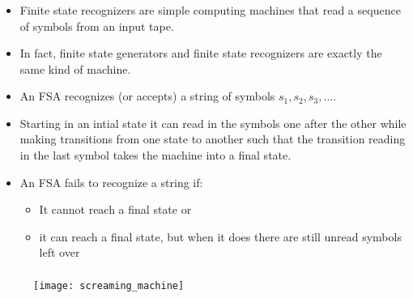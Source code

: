 \begin{frame}

	\frametitle{\insertsection}
	\framesubtitle{\insertsubsection}

	

	
\end{frame}


\begin{frame}

	\frametitle{\insertsection}
	\framesubtitle{\insertsubsection}
	
	\begin{itemize}
		\item Finite state recognizers are simple computing machines that read a sequence of symbols from an input tape.
		\item In fact, finite state generators and finite state recognizers are exactly the same kind of machine.
		\item An FSA recognizes (or accepts) a string of symbols \(s_1,s_2,s_3,\ldots \).
		\item Starting in an intial state it can read in the symbols one after the other while making transitions from one state to another such that the transition reading in the last symbol takes the machine into a final state.
		\item An FSA fails to recognize a string if:
		\begin{itemize}
			\item It cannot reach a final state or
			\item it can reach a final state, but when it does there are still unread symbols left over
		\end{itemize}
		
	\end{itemize}

\end{frame}


\begin{frame}

	\frametitle{\insertsection}
	\framesubtitle{\insertsubsection}
	
	
	\begin{figure}
			\texttt{[image: screaming\_machine]}
	\end{figure}
	

\end{frame}



